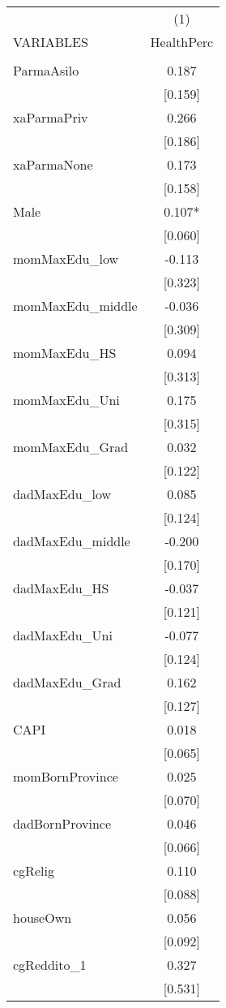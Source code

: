 \documentclass[]{article}
\begin{document}
\begin{tabular}{lc} \hline
 & (1) \\
VARIABLES & HealthPerc \\ \hline
 &  \\
ParmaAsilo & 0.187 \\
 & [0.159] \\
xaParmaPriv & 0.266 \\
 & [0.186] \\
xaParmaNone & 0.173 \\
 & [0.158] \\
Male & 0.107* \\
 & [0.060] \\
momMaxEdu\_low & -0.113 \\
 & [0.323] \\
momMaxEdu\_middle & -0.036 \\
 & [0.309] \\
momMaxEdu\_HS & 0.094 \\
 & [0.313] \\
momMaxEdu\_Uni & 0.175 \\
 & [0.315] \\
momMaxEdu\_Grad & 0.032 \\
 & [0.122] \\
dadMaxEdu\_low & 0.085 \\
 & [0.124] \\
dadMaxEdu\_middle & -0.200 \\
 & [0.170] \\
dadMaxEdu\_HS & -0.037 \\
 & [0.121] \\
dadMaxEdu\_Uni & -0.077 \\
 & [0.124] \\
dadMaxEdu\_Grad & 0.162 \\
 & [0.127] \\
CAPI & 0.018 \\
 & [0.065] \\
momBornProvince & 0.025 \\
 & [0.070] \\
dadBornProvince & 0.046 \\
 & [0.066] \\
cgRelig & 0.110 \\
 & [0.088] \\
houseOwn & 0.056 \\
 & [0.092] \\
cgReddito\_1 & 0.327 \\
 & [0.531] \\

\end{tabular}
\end{document}
